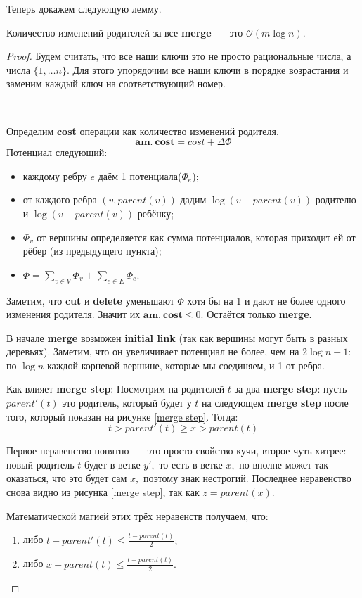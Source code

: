 Теперь докажем следующую лемму.
\begin{lemma}\label{first lemm}
Количество изменений родителей за все \textbf{merge}~--- это $\mathcal{O}(m\log{n}).$
\end{lemma}
\begin{proof}
Будем считать, что все наши ключи это не просто рациональные числа, а числа $\{1,\dots n\}.$ Для этого упорядочим все наши ключи в порядке возрастания и заменим каждый ключ на соответствующий номер.

$\quad$

Определим \textbf{cost} операции как количество изменений родителя. 
$$\mathbf{am.\: cost} = cost + \Delta\Phi$$
Потенциал следующий:
\begin{itemize}
    \item каждому ребру $e$ даём 1 потенциала($\Phi_e$);
    \item от каждого ребра $(v, parent(v))$ дадим $\log{(v - parent(v))}$ родителю и $\log{(v - parent(v))}$ ребёнку;
    \item $\Phi_v$ от вершины определяется как сумма потенциалов, которая приходит ей от рёбер (из предыдущего пункта);
    \item $\Phi = \sum\limits_{v\in V}\Phi_v + \sum\limits_{e \in E}\Phi_e.$
    
\end{itemize}
Заметим, что \textbf{cut} и \textbf{delete} уменьшают $\Phi$ хотя бы на 1 и дают не более одного изменения родителя. Значит их $\mathbf{am.\:cost} \leqslant 0.$ Остаётся только \textbf{merge}.

В начале \textbf{merge} возможен \textbf{initial link} (так как вершины могут быть в разных деревьях). Заметим, что он увеличивает потенциал не более, чем на $2\log{n} + 1:$ по $\log{n}$ каждой корневой вершине, которые мы соединяем, и 1 от ребра.

Как влияет \textbf{merge step}:
Посмотрим на родителей $t$ за два \textbf{merge step}: пусть $parent'(t)$ это родитель, который будет у $t$ на следующем \textbf{merge step} после того, который показан на рисунке \ref{merge step}. Тогда:
$$t > parent'(t)\geqslant x > parent(t)$$

Первое неравенство понятно~--- это просто свойство кучи, второе чуть хитрее: новый родитель $t$ будет в ветке $y',$ то есть в ветке $x,$ но вполне может так оказаться, что это будет сам $x,$ поэтому знак нестрогий. Последнее неравенство снова видно из рисунка \ref{merge step}, так как $z = parent(x).$

Математической магией этих трёх неравенств получаем, что:
\begin{enumerate}
    \item либо $t - parent'(t)\leqslant\frac{t - parent(t)}{2};$
    \item либо $x - parent(t)\leqslant \frac{t - parent(t)}{2}.$
\end{enumerate}


\end{proof}
